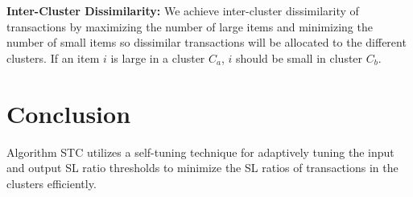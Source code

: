 \documentclass[11pt,reqno]{amsart}
\newtheorem{theorem}[subsection]{Theorem}
\theoremstyle{definition}
\newtheorem{remark}[subsection]{Remark}
\numberwithin{equation}{subsection}
\begin{document}
\textbf{Inter-Cluster Dissimilarity:} We achieve inter-cluster dissimilarity of transactions by maximizing the number of large items and minimizing the number of small items so dissimilar transactions will be allocated to the different clusters. If an item $i$ is large in a cluster $C_a$, $i$ should be small in cluster $C_b$. 





\section{Conclusion}
Algorithm STC utilizes a self-tuning technique for adaptively tuning the input and output SL ratio thresholds to minimize the SL ratios of transactions in the clusters efficiently. 
\end{document}
